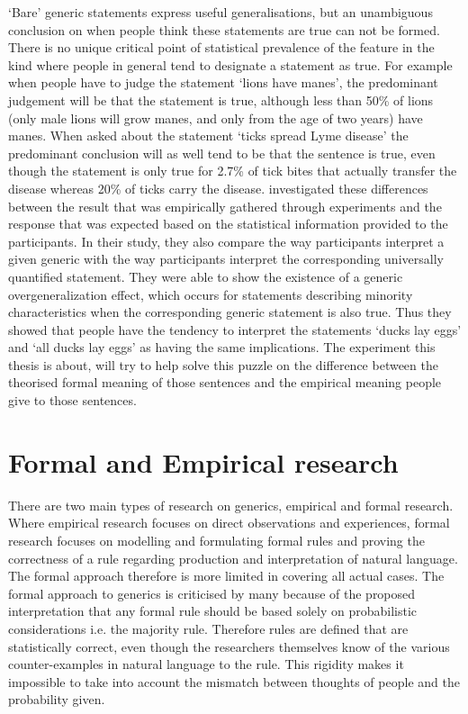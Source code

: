 \documentclass[twoside]{uva-inf-bachelor-thesis}
\theoremstyle{definition}
\begin{document}
`Bare' generic statements express useful generalisations, but an unambiguous conclusion on when people think these statements are true can not be formed. There is no unique critical point of statistical prevalence of the feature in the kind where people in general tend to designate a statement as true. For example when people have to judge the statement `lions have manes', the predominant judgement will be that the statement is true, although less than 50\% of lions (only male lions will grow manes, and only from the age of two years) have manes. When asked about the statement `ticks spread Lyme disease' the predominant conclusion will as well tend to be that the sentence is true, even though the statement is only true for 2.7\% \parencite{rivm_2019} of tick bites that actually transfer the disease whereas 20\% of ticks carry the disease. \cite{leslie2011all} investigated these differences between the result that was empirically gathered through experiments and the response that was expected based on the statistical information provided to the participants. In their study, they also compare the way participants interpret a given generic with the way participants interpret the corresponding universally quantified statement. They were able to show the existence of a generic overgeneralization effect, which occurs for statements describing minority characteristics when the corresponding generic statement is also true. Thus they showed that people have the tendency to interpret the statements `ducks lay eggs' and `all ducks lay eggs' as having the same implications. The experiment this thesis is about, will try to help solve this puzzle on the difference between the theorised formal meaning of those sentences and the empirical meaning people give to those sentences.

\section{Formal and Empirical research}
There are two main types of research on generics, empirical and formal research. Where empirical research focuses on direct observations and experiences, formal research focuses on modelling and formulating formal rules and proving the correctness of a rule regarding production and interpretation of natural language. The formal approach therefore is more limited in covering all actual cases. The formal approach to generics is criticised by many because of the proposed interpretation that any formal rule should be based solely on probabilistic considerations i.e. the majority rule. Therefore rules are defined that are statistically correct, even though the researchers themselves know of the various counter-examples in natural language to the rule. This rigidity makes it impossible to take into account the mismatch between thoughts of people and the probability given.
\end{document}
